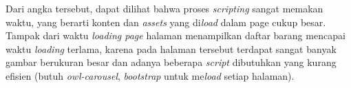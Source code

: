 Dari angka tersebut, dapat dilihat bahwa proses \textit{scripting} sangat memakan waktu, yang berarti konten dan \textit{assets} yang di\textit{load} dalam page cukup besar. Tampak dari waktu \textit{loading page} halaman menampilkan daftar barang mencapai waktu \textit{loading} terlama, karena pada halaman tersebut terdapat sangat banyak gambar berukuran besar dan adanya beberapa \textit{script} dibutuhkan yang kurang efisien (butuh \textit{owl-carousel}, \textit{bootstrap} untuk me\textit{load} setiap halaman). \\